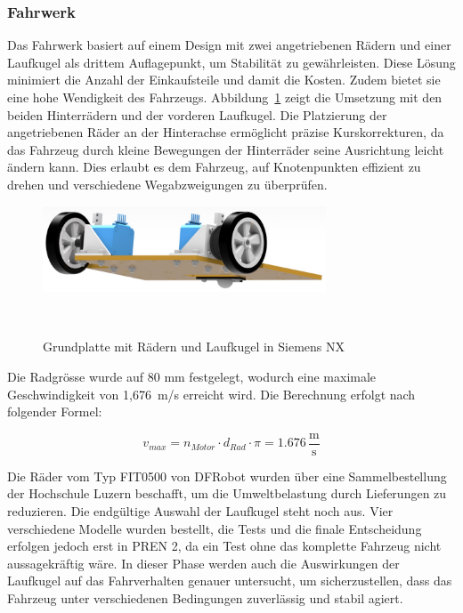 \documentclass[main.tex]{subfiles} %
\begin{document}
\newpage

\subsubsection*{Fahrwerk}

Das Fahrwerk basiert auf einem Design mit zwei angetriebenen Rädern und einer
Laufkugel als drittem Auflagepunkt, um Stabilität zu gewährleisten. Diese
Lösung minimiert die Anzahl der Einkaufsteile und damit die Kosten. Zudem
bietet sie eine hohe Wendigkeit des Fahrzeugs. Abbildung~\ref{fig:Fahrwerk}
zeigt die Umsetzung mit den beiden Hinterrädern und der vorderen Laufkugel. Die
Platzierung der angetriebenen Räder an der Hinterachse ermöglicht präzise
Kurskorrekturen, da das Fahrzeug durch kleine Bewegungen der Hinterräder seine
Ausrichtung leicht ändern kann. Dies erlaubt es dem Fahrzeug, auf Knotenpunkten
effizient zu drehen und verschiedene Wegabzweigungen zu überprüfen.

\begin{figure}[H]
    \centering
    \includegraphics[width=0.75\textwidth]{Fahrwerk.pdf}
    \caption{Grundplatte mit Rädern und Laufkugel in Siemens NX}~\label{fig:Fahrwerk}
\end{figure}

Die Radgrösse wurde auf 80 mm festgelegt, wodurch eine maximale Geschwindigkeit
von 1,676~m/s erreicht wird. Die Berechnung erfolgt nach folgender Formel:

\[ v_{max} = n_{Motor} \cdot d_{Rad} \cdot \pi = 1.676 \, \frac{\text{m}}{\text{s}} \]

Die Räder vom Typ FIT0500 von DFRobot wurden über eine Sammelbestellung der
Hochschule Luzern beschafft, um die Umweltbelastung durch Lieferungen zu
reduzieren. Die endgültige Auswahl der Laufkugel steht noch aus. Vier
verschiedene Modelle wurden bestellt, die Tests und die finale Entscheidung
erfolgen jedoch erst in PREN 2, da ein Test ohne das komplette Fahrzeug nicht
aussagekräftig wäre. In dieser Phase werden auch die Auswirkungen der Laufkugel
auf das Fahrverhalten genauer untersucht, um sicherzustellen, dass das Fahrzeug
unter verschiedenen Bedingungen zuverlässig und stabil agiert.
\end{document}
